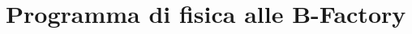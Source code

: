\documentclass[10pt,a4paper,twoside]{report}
\begin{document}
\section{Programma di fisica alle B-Factory}

\begin{comment}

Lo SM è una teoria che descrive tre delle interazioni fondamentali tra le particelle elementari, cioè l'interazione forte, debole ed elettromagnetica (ad esclusione quindi, della gravità).
Classifica tutte le particelle fino ad ora note, in 4 gruppi principali: quark, leptoni, bosoni e Higgs. 

\begin{figure}
\texttt{[image: SM]}
\caption{Modello Standard}
\label{fig:sm}
\end{figure}

Nonostante abbia ottenuto negli anni una serie di sorprendenti successi, riuscendo a predire con precisione nuove particelle e nuovi meccanismi fino a quel momento sconosciuti, ci sono ancora numerosi e fondamentali aspetti della Natura sulla quale non è in grado di dare risposte. 


\end{comment}
\end{document}
